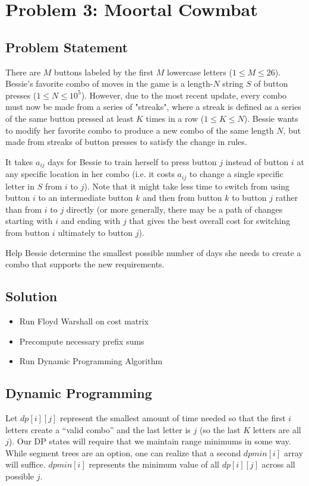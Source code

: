 \documentclass{article}
\begin{document}
\section{Problem 3: Moortal Cowmbat}
\subsection{Problem Statement}
There are $M$ buttons labeled by the first $M$ lowercase letters ($1 \leq M \leq 26$). Bessie's favorite combo of moves in the game is a length-$N$ string $S$ of button presses ($1 \leq N \leq 10^5$). However, due to the most recent update, every combo must now be made from a series of "streaks", where a streak is defined as a series of the same button pressed at least $K$ times in a row ($ 1 \leq K \leq N$). Bessie wants to modify her favorite combo to produce a new combo of the same length $N$, but made from streaks of button presses to satisfy the change in rules. 

It takes $a_{ij}$ days for Bessie to train herself to press button $j$ instead of button $i$ at any specific location in her combo (i.e. it costs $a_{ij}$ to change a single specific letter in $S$ from $i$ to $j$). Note that it might take less time to switch from using button $i$ to an intermediate button $k$ and then from button $k$ to button $j$ rather than from $i$ to $j$ directly (or more generally, there may be a path of changes starting with $i$ and ending with $j$ that gives the best overall cost for switching from button $i$ ultimately to button $j$). 

Help Bessie determine the smallest possible number of days she needs to create a combo that supports the new requirements. 
\subsection{Solution}
\begin{itemize}
    \item Run Floyd Warshall on cost matrix 
    \item Precompute necessary prefix sums
    \item Run Dynamic Programming Algorithm
\end{itemize}

\subsection{Dynamic Programming}
 Let $dp[i][j]$ represent the smallest amount of time needed so that the first $i$ letters create a “valid combo” and the last letter is $j$ (so the last $K$ letters are all $j$). Our DP states will require that we maintain range minimums in some way. While segment trees are an option, one can realize that a second $dpmin[i]$ array will suffice. $dpmin[i]$ represents the minimum value of all $dp[i][j]$ across all possible $j$.
 
\end{document}

